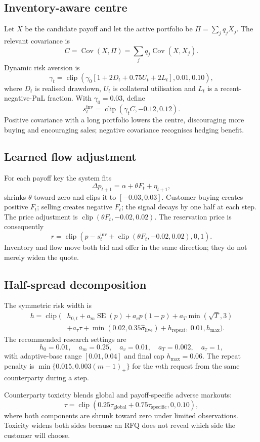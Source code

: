 \documentclass[10pt,a4paper]{article}
\newcommand{\clip}{\operatorname{clip}}
\newcommand{\Cov}{\operatorname{Cov}}
\newcommand{\1}{\mathbf{1}}
\begin{document}
\subsection{Inventory-aware centre}
Let $X$ be the candidate payoff and let the active portfolio be
$\Pi=\sum_jq_jX_j$.  The relevant covariance is
\[
 C=\Cov(X,\Pi)=\sum_jq_j\Cov(X,X_j).
\]
Dynamic risk aversion is
\[
 \gamma_t=\clip\!\left(
 \gamma_0[1+2D_t+0.75U_t+2L_t],0.01,0.10\right),
\]
where $D_t$ is realised drawdown, $U_t$ is collateral utilisation and $L_t$ is a
recent-negative-PnL fraction.  With $\gamma_0=0.03$, define
\[
 s_t^{\mathrm{inv}}=\clip(\gamma_tC,-0.12,0.12).
\]
Positive covariance with a long portfolio lowers the centre, discouraging more buying
and encouraging sales; negative covariance recognises hedging benefit.

\subsection{Learned flow adjustment}
For each payoff key the system fits
\[
 \Delta p_{t+1}=\alpha+\theta F_t+\eta_{t+1},
\]
shrinks $\theta$ toward zero and clips it to $[-0.03,0.03]$.  Customer buying creates
positive $F_t$; selling creates negative $F_t$; the signal decays by one half at each
step.  The price adjustment is $\clip(\theta F_t,-0.02,0.02)$.  The reservation price
is consequently
\[
 r=\clip\!\left(p-s_t^{\mathrm{inv}}+\clip(\theta F_t,-0.02,0.02),0,1\right).
\]
Inventory and flow move both bid and offer in the same direction; they do not merely
widen the quote.

\subsection{Half-spread decomposition}
The symmetric risk width is
\[
\begin{aligned}
 h=\clip\bigl(&h_{0,t}
 +a_m\operatorname{SE}(p)
 +a_vp(1-p)
 +a_T\min(\sqrt{T},3)\\
 &+a_{\tau}\tau
 +\min(0.02,0.35\widehat\sigma_{\mathrm{live}})
 +h_{\mathrm{repeat}},\ 0.01,h_{\max}\bigr).
\end{aligned}
\]
The recommended research settings are
\[
 h_0=0.01,\quad a_m=0.25,\quad a_v=0.01,\quad
 a_T=0.002,\quad a_{\tau}=1,
\]
with adaptive-base range $[0.01,0.04]$ and final cap $h_{\max}=0.06$.  The repeat
penalty is $\min\{0.015,0.003(m-1)_+\}$ for the $m$th request from the same
counterparty during a step.

Counterparty toxicity blends global and payoff-specific adverse markouts:
\[
 \tau=\clip(0.25\tau_{\mathrm{global}}+0.75\tau_{\mathrm{specific}},0,0.10),
\]
where both components are shrunk toward zero under limited observations.  Toxicity
widens both sides because an RFQ does not reveal which side the customer will choose.
\end{document}
